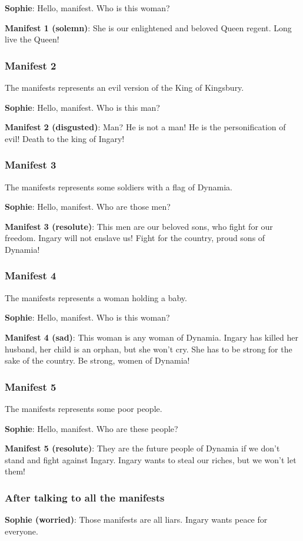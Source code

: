 \textbf{Sophie}: Hello, manifest. Who is this woman?

\textbf{Manifest 1 (solemn)}: She is our enlightened and beloved Queen regent. Long live the Queen!

\subsubsection*{Manifest 2}
The manifests represents an evil version of the King of Kingsbury.

\textbf{Sophie}: Hello, manifest. Who is this man?

\textbf{Manifest 2 (disgusted)}: Man? He is not a man! He is the personification of evil! Death to the king of Ingary!

\subsubsection*{Manifest 3}
The manifests represents some soldiers with a flag of Dynamia.

\textbf{Sophie}: Hello, manifest. Who are those men?

\textbf{Manifest 3 (resolute)}: This men are our beloved sons, who fight for our freedom. Ingary will not enslave us! Fight for the country, proud sons of Dynamia!

\subsubsection*{Manifest 4}
The manifests represents a woman holding a baby.

\textbf{Sophie}: Hello, manifest. Who is this woman?

\textbf{Manifest 4 (sad)}: This woman is any woman of Dynamia. Ingary has killed her husband, her child is an orphan, but she won't cry. She has to be strong for the sake of the country. Be strong, women of Dynamia!

\subsubsection*{Manifest 5}
The manifests represents some poor people.

\textbf{Sophie}: Hello, manifest. Who are these people?

\textbf{Manifest 5 (resolute)}: They are the future people of Dynamia if we don't stand and fight against Ingary. Ingary wants to steal our riches, but we won't let them!

\subsubsection*{After talking to all the manifests}
\textbf{Sophie (worried)}: Those manifests are all liars. Ingary wants peace for everyone.

